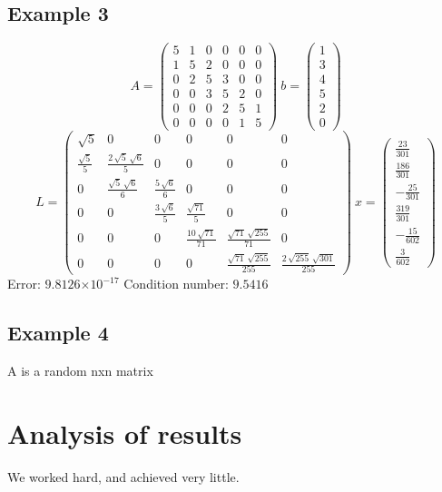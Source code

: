 \documentclass[12pt]{article}
\providecommand{\e}[1]{\ensuremath{\times 10^{#1}}}
\begin{document}
\subsection{Example 3}
$$A=\left(\begin{array}{cccccc} 5 & 1 & 0 & 0 & 0 & 0\\ 1 & 5 & 2 & 0 & 0 & 0\\ 0 & 2 & 5 & 3 & 0 & 0\\ 0 & 0 & 3 & 5 & 2 & 0\\ 0 & 0 & 0 & 2 & 5 & 1\\ 0 & 0 & 0 & 0 & 1 & 5 \end{array}\right)\
b=\left(\begin{array}{c} 1\\ 3\\ 4\\ 5\\ 2\\ 0 \end{array}\right)
$$
$$
L=\left(\begin{array}{cccccc} \sqrt{5} & 0 & 0 & 0 & 0 & 0\\ \frac{\sqrt{5}}{5} & \frac{2\,\sqrt{5}\,\sqrt{6}}{5} & 0 & 0 & 0 & 0\\ 0 & \frac{\sqrt{5}\,\sqrt{6}}{6} & \frac{5\,\sqrt{6}}{6} & 0 & 0 & 0\\ 0 & 0 & \frac{3\,\sqrt{6}}{5} & \frac{\sqrt{71}}{5} & 0 & 0\\ 0 & 0 & 0 & \frac{10\,\sqrt{71}}{71} & \frac{\sqrt{71}\,\sqrt{255}}{71} & 0\\ 0 & 0 & 0 & 0 & \frac{\sqrt{71}\,\sqrt{255}}{255} & \frac{2\,\sqrt{255}\,\sqrt{301}}{255} \end{array}\right)\
x=\left(\begin{array}{c} \frac{23}{301}\\ \frac{186}{301}\\ -\frac{25}{301}\\ \frac{319}{301}\\ -\frac{15}{602}\\ \frac{3}{602} \end{array}\right)
$$
Error: $9.8126\e{-17}$ Condition number: $9.5416$
\subsection{Example 4}
A is a random nxn matrix
\section{Analysis of results}
We worked hard, and achieved very little.
\end{document}
